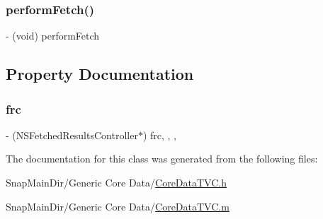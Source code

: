 \subsubsection{\texorpdfstring{perform\+Fetch()}{performFetch()}}
{\footnotesize\ttfamily -\/ (void) perform\+Fetch \begin{DoxyParamCaption}{ }\end{DoxyParamCaption}}



\subsection{Property Documentation}
\hypertarget{interface_core_data_t_v_c_adee402ae0eb3dd0c2b08828bc5fdf56c}{}\label{interface_core_data_t_v_c_adee402ae0eb3dd0c2b08828bc5fdf56c} 
\subsubsection{\texorpdfstring{frc}{frc}}
{\footnotesize\ttfamily -\/ (N\+S\+Fetched\+Results\+Controller$\ast$) frc\hspace{0.3cm}{\ttfamily [read]}, {\ttfamily [write]}, {\ttfamily [nonatomic]}, {\ttfamily [strong]}}



The documentation for this class was generated from the following files\+:\begin{DoxyCompactItemize}
\item 
Snap\+Main\+Dir/\+Generic Core Data/\hyperlink{_core_data_t_v_c_8h}{Core\+Data\+T\+V\+C.\+h}\item 
Snap\+Main\+Dir/\+Generic Core Data/\hyperlink{_core_data_t_v_c_8m}{Core\+Data\+T\+V\+C.\+m}\end{DoxyCompactItemize}
